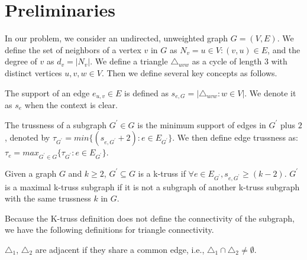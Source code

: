 \section{Preliminaries}
\label{preliminary}

In our problem, we consider an undirected, unweighted graph $G = (V,E)$. 
We define the set of neighbors of a vertex $v$ in $G$ as $N_v = {u \in V :(v, u) \in E}$, and the degree of $v$ as $d_v = |N_v|$. We define a triangle $\triangle_{uvw}$ as a cycle of length $3$ with distinct vertices $u, v, w \in V$. 
Then we define several key concepts as follows.

\begin{Def}
The support of an edge $e_{u,v} \in E$ is defined as $s_{e,G} = |{\triangle_{uvw} : w \in V}|$. 
We denote it as $s_e$ when the context is clear.
\label{def:edge_support}
\end{Def}

\begin{Def}[Trussness] 
The trussness of a subgraph $G^{\prime} \in G$ is the minimum support of edges in $G^{\prime}$ plus $2$, denoted by $\tau_{G^{\prime}} = min\{(s_{e,G^{\prime}} + 2): e \in E_{G^{\prime}}\} $.  We then define edge trussness as: $\tau_{e} = max_{G^{\prime} \in G}\{\tau_{G^{\prime}}: e \in E_{G^{\prime}}\}$.
\label{def:trussness}
\end{Def}

\begin{Def}[K-truss]
Given a graph $G$ and $k \ge 2$, $G^{\prime} \subseteq G$ is a k-truss if $\forall e \in E_{G^{\prime}}, s_{e,G^{\prime}} \ge (k - 2)$. 
$G^{\prime}$ is a maximal k-truss subgraph if it is not a subgraph of another k-truss subgraph with the same trussness $k$ in $G$.
\label{def:k-truss}
\end{Def}


Because the K-truss definition does not define the connectivity of the subgraph, we have the following definitions for triangle connectivity.

\begin{Def}
${\triangle}_{1}$, ${\triangle}_{2}$ are adjacent if they share a common edge, i.e., ${\triangle}_{1} \cap {\triangle}_{2} \neq \emptyset$. 
\label{def:triangle_adjacency}
\end{Def}

